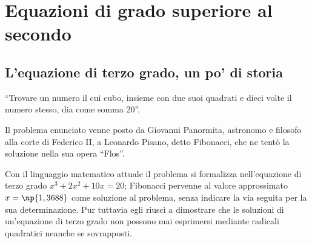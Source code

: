 \chapter{Equazioni di grado superiore al secondo}
\section{L'equazione di terzo grado, un po' di storia}
``Trovare un numero il cui cubo, insieme con due suoi quadrati e dieci volte il numero stesso, dia come somma 20''.

Il problema enunciato venne posto da Giovanni Panormita, astronomo e filosofo alla corte di Federico II, a Leonardo Pisano, detto Fibonacci, che ne tentò la soluzione nella sua opera ``Flos''.

Con il linguaggio matematico attuale il problema si formalizza nell'equazione di terzo grado $x^3+2x^2+10x=20$; Fibonacci pervenne al valore approssimato $x=\np{1,3688}$ come soluzione al problema, senza indicare la via seguita per la sua determinazione. Pur tuttavia egli riuscì a dimostrare che le soluzioni di un'equazione di terzo grado non possono mai esprimersi mediante radicali quadratici neanche se sovrapposti.

